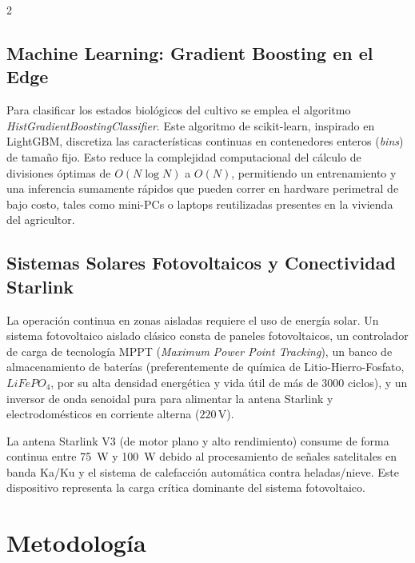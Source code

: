 \documentclass[a4paper, 11pt]{article}
\begin{document}
\begin{multicols}{2}
\subsection{Machine Learning: Gradient Boosting en el Edge}
Para clasificar los estados biológicos del cultivo se emplea el algoritmo \textit{HistGradientBoostingClassifier}. Este algoritmo de scikit-learn, inspirado en LightGBM, discretiza las características continuas en contenedores enteros (\textit{bins}) de tamaño fijo. Esto reduce la complejidad computacional del cálculo de divisiones óptimas de $O(N \log N)$ a $O(N)$, permitiendo un entrenamiento y una inferencia sumamente rápidos que pueden correr en hardware perimetral de bajo costo, tales como mini-PCs o laptops reutilizadas presentes en la vivienda del agricultor.

\subsection{Sistemas Solares Fotovoltaicos y Conectividad Starlink}
La operación continua en zonas aisladas requiere el uso de energía solar. Un sistema fotovoltaico aislado clásico consta de paneles fotovoltaicos, un controlador de carga de tecnología MPPT (\textit{Maximum Power Point Tracking}), un banco de almacenamiento de baterías (preferentemente de química de Litio-Hierro-Fosfato, $LiFePO_4$, por su alta densidad energética y vida útil de más de 3000 ciclos), y un inversor de onda senoidal pura para alimentar la antena Starlink y electrodomésticos en corriente alterna ($220\,\text{V}$).

La antena Starlink V3 (de motor plano y alto rendimiento) consume de forma continua entre \SI{75}{W} y \SI{100}{W} debido al procesamiento de señales satelitales en banda Ka/Ku y el sistema de calefacción automática contra heladas/nieve. Este dispositivo representa la carga crítica dominante del sistema fotovoltaico.

\section{Metodología}


\end{multicols}
\end{document}
